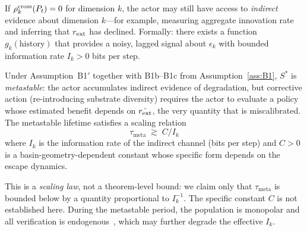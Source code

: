 \begin{assumption}
\label{ass:B1prime}
If $\rho^{\mathrm{cross}}_k(P_t) = 0$ for dimension $k$, the actor may still have
access to \emph{indirect} evidence about dimension $k$---for example,
measuring aggregate innovation rate and inferring that $r_{\mathrm{ext}}$ has
declined.  Formally: there exists a function $g_k(\text{history})$ that
provides a noisy, lagged signal about $\epsilon_k$ with bounded
information rate $I_k > 0$ bits per step.
\end{assumption}

\begin{proposition}
\label{prop:metastable}
Under Assumption~B1$'$ together with B1b--B1c from
Assumption~\ref{ass:B1}, $S^*$ is \emph{metastable}: the actor
accumulates indirect evidence of degradation, but corrective action
(re-introducing substrate diversity) requires the actor to evaluate a
policy whose estimated benefit depends on $\hat{r_{\mathrm{ext}}}$, the very
quantity that is miscalibrated.  The metastable lifetime satisfies a
scaling relation
\begin{equation}
\label{eq:metastable_lifetime}
\tau_{\mathrm{meta}} \;\gtrsim\; C / I_k
\end{equation}
where $I_k$ is the information rate of the indirect channel (bits per
step) and $C > 0$ is a basin-geometry-dependent constant whose specific
form depends on the escape dynamics.

This is a \emph{scaling law}, not a theorem-level bound: we claim only
that $\tau_{\mathrm{meta}}$ is bounded below by a quantity proportional
to $I_k^{-1}$.  The specific constant $C$ is not established here.
During the metastable period, the population is monopolar and all
verification is endogenous~\citep[Theorem~1]{lasser2026exo}, which may
further degrade the effective $I_k$.
\end{proposition}

